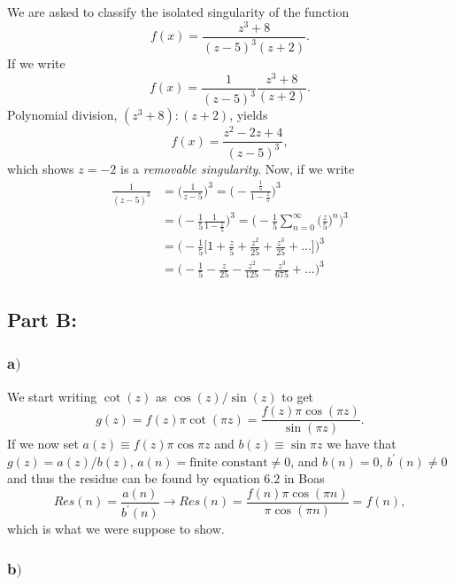 \documentclass{article}
\begin{document}
We are asked to classify the isolated singularity of the function
\begin{equation}
f(x) = \frac{z^3 + 8}{(z-5)^3(z+2)}.
\end{equation}
If we write
\begin{equation}
f(x) = \frac{1}{(z-5)^3}\frac{z^3+8}{(z+2)}.
\end{equation}
Polynomial division, $(z^3+8):(z+2)$, yields
\begin{equation}
f(x) = \frac{z^2 - 2z + 4}{(z-5)^3},
\end{equation}
which shows $z = -2$ is a \textit{removable singularity}. Now, if we write
\begin{align}
\frac{1}{(z-5)^3} &= \bigg(\frac{1}{z-5}\bigg)^3 = \bigg(-\frac{\frac{1}{5}}{1-\frac{z}{5}}\bigg)^3 \\
 &= \bigg(-\frac{1}{5}\frac{1}{1-\frac{z}{5}}\bigg)^3 = \bigg(-\frac{1}{5}\sum_{n=0}^{\infty}\big(\frac{z}{5}\big)^n\bigg)^3 \\
 &= \bigg(-\frac{1}{5}\bigg[1 + \frac{z}{5} + \frac{z^2}{25} + \frac{z^3}{25} + ... \bigg]\bigg)^3 \\
 &= \bigg(-\frac{1}{5} - \frac{z}{25} - \frac{z^2}{125} - \frac{z^3}{675} + ...\bigg)^3
\end{align}


\subsection*{Part B:}

\subsubsection*{a$)$}
We start writing $\cot{(z)}$ as $\cos{(z)}/\sin{(z)}$ to get
\begin{equation}
g(z) = f(z)\pi\cot{(\pi z)} = \frac{f(z)\pi\cos{(\pi z)}}{\sin{(\pi z)}}.
\end{equation}
If we now set $a(z) \equiv f(z)\pi\cos{\pi z}$ and $b(z) \equiv \sin{\pi z}$ we have that $g(z) = a(z)/b(z)$, $a(n) = \text{finite constant} \neq 0$, and $b(n) = 0$, $b^{'}(n) \neq 0$ and thus the residue can be found by equation $6.2$ in Boas
\begin{equation}
Res(n) = \frac{a(n)}{b^{'}(n)} \rightarrow Res(n) = \frac{f(n)\pi\cos(\pi n)}{\pi\cos(\pi n)} = f(n),
\end{equation}
which is what we were suppose to show.
\subsubsection*{b$)$}
\end{document}
